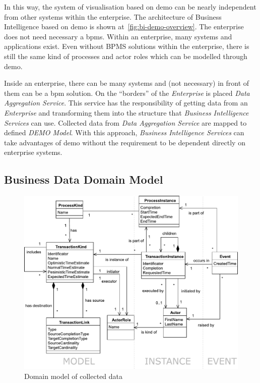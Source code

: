 In this way, the system of visualisation based on \gls{demo} can be nearly independent from other systems within the enterprise. The architecture of Business Intelligence based on \gls{demo} is shown at~\cref{fig:bi-demo-overview}. The enterprise does not need necessary a \gls{bpms}. Within an enterprise, many systems and applications exist. Even without BPMS solutions within the enterprise, there is still the same kind of processes and actor roles which can be modelled through \gls{demo}.

Inside an enterprise, there can be many systems and (not necessary) in front of them can be a \gls{bpm} solution. On the ``borders'' of the \textit{Enterprise} is placed \textit{Data Aggregation Service}. This service has the responsibility of getting data from an \textit{Enterprise} and transforming them into the structure that \textit{Business Intelligence Services} can use. Collected data from \textit{Data Aggregation Service} are mapped to defined \textit{DEMO Model}.
With this approach, \textit{Business Intelligence Services} can take advantages of \gls{demo} without the requirement to be dependent directly on enterprise systems.
\subsection{Business Data Domain Model}
\begin{figure}[ht!]
  \centering
  \includegraphics[width=13cm,keepaspectratio]{img/domain-data-model}
  \caption{Domain model of collected data}
  \label{fig:domain-data-model}
\end{figure}    


